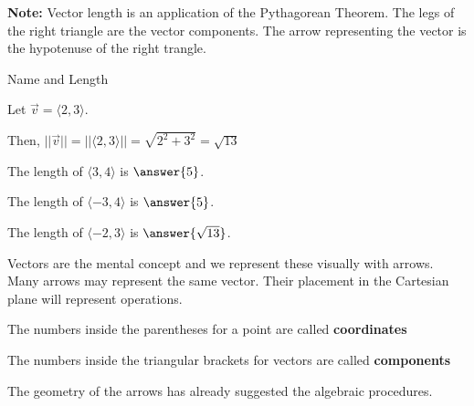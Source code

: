 \documentclass{ximera}
\begin{document}
\textbf{Note:} Vector length is an application of the Pythagorean Theorem.  The legs of the right triangle are the vector components.  The arrow representing the vector is the hypotenuse of the right trangle.


\begin{example} Name and Length 

Let $\vec{v} = \langle 2, 3 \rangle$. 

Then, $|| \vec{v} || = || \langle 2, 3 \rangle || = \sqrt{2^2 + 3^2} = \sqrt{13}$

\end{example}







\begin{question} 


The length of  $\langle 3, 4 \rangle$ is $\answer{5}$.



\end{question}






\begin{question} 


The length of  $\langle -3, 4 \rangle$ is $\answer{5}$.



\end{question}



\begin{question} 


The length of  $\langle -2, 3 \rangle$ is $\answer{\sqrt{13}}$.



\end{question}




Vectors are the mental concept and we represent these visually with arrows. Many arrows may represent the same vector.  Their placement in the Cartesian plane will represent operations.


The numbers inside the parentheses for a point are called \textbf{\textcolor{purple!85!blue}{coordinates}}  

The numbers inside the triangular brackets for vectors are called \textbf{\textcolor{purple!85!blue}{components}}  



The geometry of the arrows has already suggested the algebraic procedures.
\end{document}
